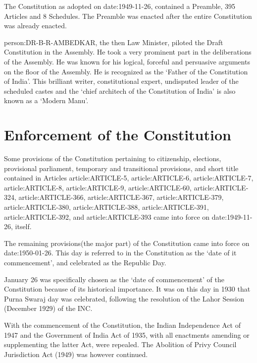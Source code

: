 { The Constitution as adopted on \gls{date:1949-11-26}, contained a Preamble, 395 Articles and 8 Schedules}. The Preamble was enacted after the entire Constitution was already enacted.

\gls{person:DR-B-R-AMBEDKAR}, the then Law Minister, piloted the Draft Constitution in the Assembly. He took a very prominent part in the deliberations of the Assembly. He was known for his logical, forceful and persuasive arguments on the floor of the Assembly. He is recognized as the `Father of the Constitution of India'. This brilliant writer, constitutional expert, undisputed leader of the scheduled castes and the `chief architech of the Constitution of India' is also known as a `Modern Manu'.

\section{Enforcement of the Constitution}

Some provisions of the Constitution pertaining to citizenship, elections, provisional parliament, temporary and transitional provisions, and short title contained in Articles \gls{article:ARTICLE-5}, \gls{article:ARTICLE-6}, \gls{article:ARTICLE-7}, \gls{article:ARTICLE-8}, \gls{article:ARTICLE-9}, \gls{article:ARTICLE-60}, \gls{article:ARTICLE-324}, \gls{article:ARTICLE-366}, \gls{article:ARTICLE-367}, \gls{article:ARTICLE-379}, \gls{article:ARTICLE-380}, \gls{article:ARTICLE-388}, \gls{article:ARTICLE-391}, \gls{article:ARTICLE-392}, and \gls{article:ARTICLE-393} came into force on \gls{date:1949-11-26}, itself.

The remaining provisions(the major part) of the Constitution came into force on \gls{date:1950-01-26}. This day is referred to in the Constitution as the `date of it commencement', and celebrated as the Republic Day.

January 26 was specifically chosen as the `date of commencement' of the Constitution because of its historical importance. It was on this day in 1930 that { Purna Swaraj} day was celebrated, following the resolution of the Lahor Session (December 1929) of the INC.

With the commencement of the Constitution, the Indian Independence Act of 1947 and the Government of India Act of 1935, with all enactments amending or supplementing the latter Act, were repealed. The Abolition of Privy Council Jurisdiction Act (1949) was however continued.

